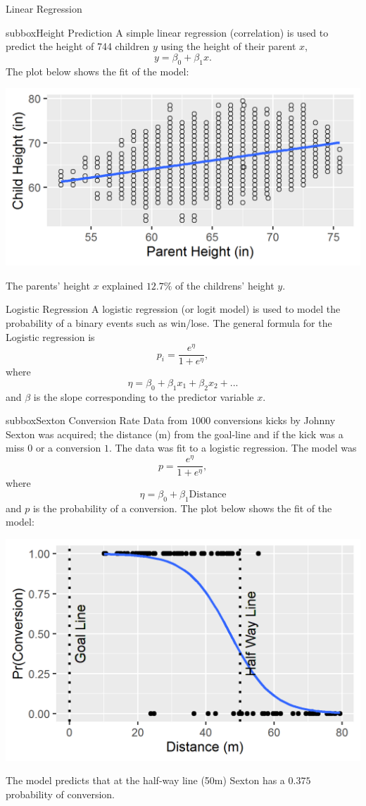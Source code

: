 \documentclass[10pt,a4paper]{article}
\begin{document}
\begin{multicols}{3}
\begin{textbox}{Linear Regression}
\begin{subbox}{subbox}{Height Prediction}
\tiny
A simple linear regression (correlation) is used to predict the height of 744 children $y$ using the height of their parent $x$, 
\[  y=\beta_0+\beta_1 x.\]
The plot below shows the fit of the model:
\begin{center}
\includegraphics[width=\textwidth]{Figures/Regression/Linear_Regression.png}
\end{center}
The parents' height $x$ explained $12.7\%$ of the childrens' height $y$.
\end{subbox}
\end{textbox}
\begin{textbox}{Logistic Regression}
A logistic regression (or logit model) is used to model the probability of a binary events such as win/lose.
The general formula for the Logistic regression is 
\[  p_i=\frac{e^{\eta}}{1+e^{\eta}},\]
where
\[\eta=\beta_0+\beta_1 x_{1} +\beta_2 x_{2}+... \]
and $\beta$ is the slope corresponding to the predictor variable $x$.
\begin{subbox}{subbox}{Sexton Conversion Rate}
\tiny
Data from $1000$ conversions kicks by Johnny Sexton was acquired; the  distance (m) from the goal-line and if the kick was a  miss $0$  or a conversion $1$. The data  was fit to a logistic regression. The model was  
\[  p=\frac{e^{\eta}}{1+e^{\eta}},\]
where
\[\eta=\beta_0+\beta_1 \text{Distance} \]
and $p$ is the probability of a conversion.
The plot below shows the fit of the model:
\begin{center}
\includegraphics[width=\textwidth]{Figures/Regression/Sexton.png}
\end{center}
The model predicts that at the half-way line (50m) Sexton has a  $0.375$ probability of conversion.


\end{subbox}
\end{textbox}
\end{multicols}
\end{document}
